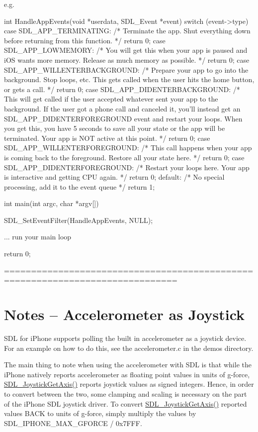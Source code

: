 e.\+g. \begin{DoxyVerb}int HandleAppEvents(void *userdata, SDL_Event *event)
{
    switch (event->type)
    {
    case SDL_APP_TERMINATING:
        /* Terminate the app.
           Shut everything down before returning from this function.
        */
        return 0;
    case SDL_APP_LOWMEMORY:
        /* You will get this when your app is paused and iOS wants more memory.
           Release as much memory as possible.
        */
        return 0;
    case SDL_APP_WILLENTERBACKGROUND:
        /* Prepare your app to go into the background.  Stop loops, etc.
           This gets called when the user hits the home button, or gets a call.
        */
        return 0;
    case SDL_APP_DIDENTERBACKGROUND:
        /* This will get called if the user accepted whatever sent your app to the background.
           If the user got a phone call and canceled it, you'll instead get an SDL_APP_DIDENTERFOREGROUND event and restart your loops.
           When you get this, you have 5 seconds to save all your state or the app will be terminated.
           Your app is NOT active at this point.
        */
        return 0;
    case SDL_APP_WILLENTERFOREGROUND:
        /* This call happens when your app is coming back to the foreground.
           Restore all your state here.
        */
        return 0;
    case SDL_APP_DIDENTERFOREGROUND:
        /* Restart your loops here.
           Your app is interactive and getting CPU again.
        */
        return 0;
    default:
        /* No special processing, add it to the event queue */
        return 1;
    }
}

int main(int argc, char *argv[])
{
    SDL_SetEventFilter(HandleAppEvents, NULL);

    ... run your main loop

    return 0;
}
\end{DoxyVerb}


============================================================================== \section*{Notes -- Accelerometer as Joystick }

S\+DL for i\+Phone supports polling the built in accelerometer as a joystick device. For an example on how to do this, see the accelerometer.\+c in the demos directory.

The main thing to note when using the accelerometer with S\+DL is that while the i\+Phone natively reports accelerometer as floating point values in units of g-\/force, \mbox{\hyperlink{_s_d_l__joystick_8h_ac6fbda13b93679bedfc34733d4b2e748}{S\+D\+L\+\_\+\+Joystick\+Get\+Axis()}} reports joystick values as signed integers. Hence, in order to convert between the two, some clamping and scaling is necessary on the part of the i\+Phone S\+DL joystick driver. To convert \mbox{\hyperlink{_s_d_l__joystick_8h_ac6fbda13b93679bedfc34733d4b2e748}{S\+D\+L\+\_\+\+Joystick\+Get\+Axis()}} reported values B\+A\+CK to units of g-\/force, simply multiply the values by S\+D\+L\+\_\+\+I\+P\+H\+O\+N\+E\+\_\+\+M\+A\+X\+\_\+\+G\+F\+O\+R\+CE / 0x7\+F\+FF. 

